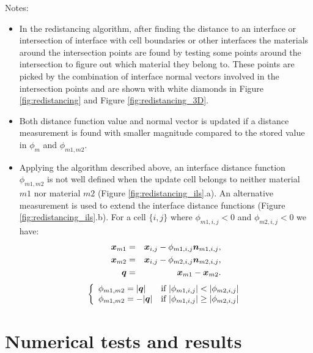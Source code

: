 \documentclass[]{article}
\newcommand{\tn}{\textnormal}
\newcommand{\bmq}{\mbox{\boldmath $q$\unboldmath}}
\newcommand{\bmx}{\mbox{\boldmath $x$\unboldmath}}
\newcommand{\bmn}{\mbox{\boldmath $n$\unboldmath}}
\begin{document}
Notes:
\begin{itemize}
\item[-] In the redistancing algorithm, 
  after finding the distance to an interface or intersection of 
  interface with cell boundaries or other interfaces the 
  materials around the intersection points are found by 
  testing some points around the intersection to figure out 
  which material they belong to. These points are 
  picked by the combination of interface normal vectors 
  involved in the intersection points and are shown with white 
  diamonds in Figure \ref{fig:redistancing} and 
  Figure \ref{fig:redistancing_3D}.
\item[-] Both distance function value and normal vector is 
 updated if a distance measurement is found with smaller 
 magnitude compared to the stored value in $\phi_{m}$ and $\phi_{m1,m2}$.
\item[-] Applying the algorithm described above, an interface 
 distance function $\phi_{m1,m2}$ is not well defined when the 
 update cell belongs to neither material $m1$ nor 
 material $m2$ (Figure \ref{fig:redistancing_ils}.a). 
 An alternative measurement is used to extend the 
 interface distance functions (Figure \ref{fig:redistancing_ils}.b). 
 For a cell $\{i,j\}$ where $\phi_{m1,i,j}<0$ and $\phi_{m2,i,j}<0$ we have:
  \begin{eqnarray}
    \bmx_{m1} &=& \bmx_{i,j} - \phi_{m1,i,j} \bmn_{m1,i,j}, \\
    \bmx_{m2} &=& \bmx_{i,j} - \phi_{m2,i,j} \bmn_{m2,i,j}, \\
    \bmq &=& \bmx_{m1} - \bmx_{m2}.
  \end{eqnarray}
  \begin{equation}
    \left\{
      \begin{array}{lll}
        \phi_{m1,m2} = |\bmq|  &\tn{if } |\phi_{m1,i,j}| < |\phi_{m2,i,j}| \\
        \phi_{m1,m2} = -|\bmq| &\tn{if } |\phi_{m1,i,j}| \ge |\phi_{m2,i,j}| \\
      \end{array}
    \right.
  \end{equation}
\end{itemize}
 

\section{Numerical tests and results}



\end{document}

